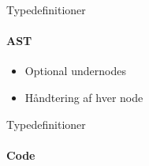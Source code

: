 \begin{frame}{Typedefinitioner}
  \framesubtitle{AST}
  
  \begin{itemize}
    \item Optional undernodes
    \item Håndtering af hver node
  \end{itemize}
\end{frame}

\begin{frame}{Typedefinitioner}
  \framesubtitle{Code}
  \fontsize{7pt}{7.2}\selectfont

\end{frame}


